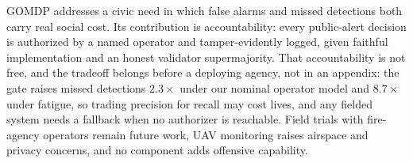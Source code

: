 \documentclass[letterpaper]{article} %
\begin{document}
GOMDP addresses a civic need in which false alarms and missed detections both carry real social cost. Its contribution is accountability: every public-alert decision is authorized by a named operator and tamper-evidently logged, given faithful implementation and an honest validator supermajority. That accountability is not free, and the tradeoff belongs before a deploying agency, not in an appendix: the gate raises missed detections $2.3\times$ under our nominal operator model and $8.7\times$ under fatigue, so trading precision for recall may cost lives, and any fielded system needs a fallback when no authorizer is reachable. Field trials with fire-agency operators remain future work, UAV monitoring raises airspace and privacy concerns, and no component adds offensive capability.


\end{document}
